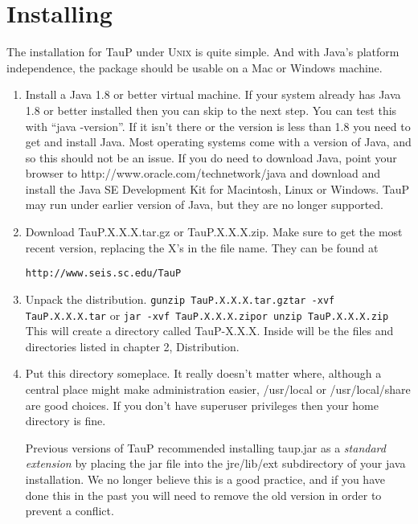 
\section{Installing}
\label{install}

The installation for TauP under \textsc{Unix} is quite simple. And with Java's 
platform independence, the package should be usable on a Mac or Windows
machine.

\begin{enumerate}
\item Install a Java 1.8 or better virtual machine. If your system already has Java 1.8
or better installed then you can skip to the next step. You can test this
with ``java -version''. If it isn't there or the version is less than 1.8
you need to get and install Java. Most operating systems come with a version 
of Java, and so this should not be an issue. If you do need to download Java, 
point
your browser to http://www.oracle.com/technetwork/java and download and install
the Java SE Development Kit for Macintosh, Linux or Windows. TauP may run under earlier version of Java, but they are no longer supported.

\item Download TauP.X.X.X.tar.gz or TauP.X.X.X.zip. Make sure to get the most recent version, replacing the X's  in the file name. They can be found at

\texttt{http://www.seis.sc.edu/TauP}

\item Unpack the distribution.
\texttt{\newline gunzip TauP.X.X.X.tar.gz\newline tar -xvf TauP.X.X.X.tar\newline}
or
\texttt{\newline jar -xvf TauP.X.X.X.zip\newline or unzip TauP.X.X.X.zip}
This will create a directory called TauP-X.X.X. Inside
will be the files and directories listed in chapter 2, Distribution.

\item Put this directory someplace. It really doesn't matter where, although
a central place might make administration easier, /usr/local or 
/usr/local/share are good choices. If you don't have superuser privileges
then your home directory is fine. 

Previous versions of TauP recommended installing taup.jar as a \textit{standard extension} by placing the jar file into the jre/lib/ext subdirectory of your java installation. We no longer believe this is a good
practice, and if you have done this in the past you will need to remove the old version in order to
prevent a conflict.


\end{enumerate}
